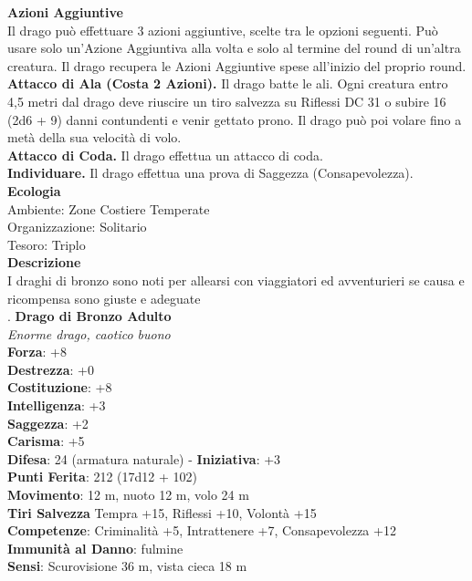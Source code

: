 \begin{multicols}{2}
\textbf{Azioni Aggiuntive}\\
Il drago può effettuare 3 azioni aggiuntive, scelte tra le opzioni seguenti. Può usare solo un'Azione Aggiuntiva alla volta e solo al termine del round di un'altra creatura. Il drago recupera le Azioni Aggiuntive spese all'inizio del proprio round.\\
\textbf{Attacco di Ala (Costa 2 Azioni).} Il drago batte le ali. Ogni creatura entro 4,5 metri dal drago deve riuscire un tiro salvezza su Riflessi DC  31 o subire 16 (2d6 + 9) danni contundenti e venir gettato prono. Il drago può poi volare fino a metà della sua velocità di volo.\\
\textbf{Attacco di Coda.} Il drago effettua un attacco di coda.\\
\textbf{Individuare.} Il drago effettua una prova di Saggezza (Consapevolezza).\\
\textbf{Ecologia}\\
Ambiente: Zone Costiere Temperate\\
Organizzazione: Solitario\\
Tesoro: Triplo\\
\textbf{Descrizione}\\
I draghi di bronzo sono noti per allearsi con viaggiatori ed avventurieri se causa e ricompensa sono giuste e adeguate\\
.
\medskip\textbf{Drago di Bronzo Adulto}\\
\emph{Enorme drago, caotico buono}\\
\textbf{Forza}: +8\\
\textbf{Destrezza}: +0\\
\textbf{Costituzione}: +8\\
\textbf{Intelligenza}: +3\\
\textbf{Saggezza}: +2\\
\textbf{Carisma}: +5\\
\textbf{Difesa}: 24 (armatura naturale) - \textbf{Iniziativa}: +3\\
\textbf{Punti Ferita}: 212 (17d12 + 102)\\
\textbf{Movimento}: 12 m, nuoto 12 m, volo 24 m\\
\textbf{Tiri Salvezza} Tempra +15, Riflessi +10, Volontà +15\\
\textbf{Competenze}: Criminalità +5, Intrattenere +7, Consapevolezza +12\\
\textbf{Immunità al Danno}: fulmine\\
\textbf{Sensi}: Scurovisione 36 m, vista cieca 18 m\\

\end{multicols}
